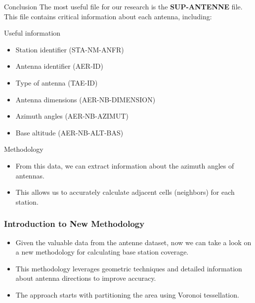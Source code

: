\begin{frame}{Conclusion}
            The most useful file for our research is the \textbf{SUP-ANTENNE} file.
            This file contains critical information about each antenna, including:
        \begin{block}{Useful information}
            \begin{itemize}
                \item Station identifier (STA-NM-ANFR)
                \item Antenna identifier (AER-ID)
                \item Type of antenna (TAE-ID)
                \item Antenna dimensions (AER-NB-DIMENSION)
                \item Azimuth angles (AER-NB-AZIMUT)
                \item Base altitude (AER-NB-ALT-BAS)
            \end{itemize}
        \end{block}
        \begin{block}{Methodology}
            \begin{itemize}
                \item From this data, we can extract information about the azimuth angles of antennas.
                \item This allows us to accurately calculate adjacent cells (neighbors) for each station.
            \end{itemize}
        \end{block}
\end{frame}


\begin{frame}
\frametitle{Introduction to New Methodology}
\begin{itemize}
    \item Given the valuable data from the antenne dataset, now we can take a look on a new methodology for calculating base station coverage.
    \item This methodology leverages geometric techniques and detailed information about antenna directions to improve accuracy.
    \item The approach starts with partitioning the area using Voronoi tessellation.
\end{itemize}
\end{frame}



